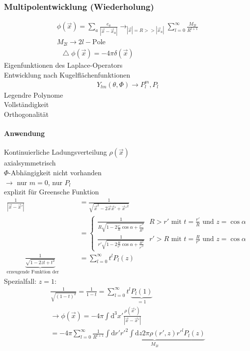 \documentclass[a4paper]{article}
\newcommand*\laplace{\mathop{}\!\mathbin\bigtriangleup}
\begin{document}
\subsubsection{Multipolentwicklung (Wiederholung)}
\begin{align}
\phi(\vec{x})=\sum_a\frac{e_a}{|\vec{x}-\vec{x}_a|}
\rightarrow_{|\vec{x}|=R>>|\vec{x}_a|} \sum^\infty_{l=0}\frac{M_{2l}}{R^{l+1}}\\
M_{2l}\rightarrow2l-\text{Pole}\\
\laplace\phi(\vec{x})=-4\pi\delta(\vec{x})
\end{align}
Eigenfunktionen des Laplace-Operators\\
Entwicklung nach Kugelflächenfunktionen
\begin{align}
Y_{lm}(\theta,\Phi)\rightarrow P_l^m,P_l
\end{align}
Legendre Polynome\\
Vollständigkeit\\
Orthogonalität\\
\paragraph{Anwendung}
Kontinuierliche Ladungsverteilung $\rho(\vec{x})$\\
axialsymmetrisch\\
$\Phi$-Abhängigkeit nicht vorhanden\\
$\rightarrow$ nur $m=0$, nur $P_l$\\
explizit für Greensche Funktion
\begin{align}
\frac{1}{|\vec{x}-\vec{x}'|}&=\frac{1}{\sqrt{\vec{x}^2-2\vec{x}\vec{x}'+\vec{x}'^2}}\\
&=\begin{cases}\frac{1}{R\sqrt{1-2\frac{r'}{R}\cos\alpha+\frac{r'^2}{R^2}}}
\text{  } R>r' \text{ mit } t=\frac{r'}{R} \text { und }z=\cos\alpha\\
\frac{1}{r'\sqrt{1-2\frac{R}{r'}\cos\alpha+\frac{R^2}{r'^2}}} \text{  } r'>R
\text{ mit } t=\frac{R}{r'} \text { und }z=\cos\alpha\end{cases}\\
\underbrace{\frac{1}{\sqrt{1-2zt+t^2}}}_{\text{erzeugende
Funktion der Legende Polynome}}&=\sum^\infty_{l=0}t^l P_l(z)
\end{align}
Spezialfall: $z=1$:
\begin{align}
\frac{1}{\sqrt{(1-t)^2}}=\frac{1}{1-t}=\sum^\infty_{l=0}t^l
\underbrace{P_l(1)}_{=1}\\
\rightarrow
\phi(\vec{x})=-4\pi\int \mathrm{d}^3x'\frac{\rho(\vec{x}')}{|\vec{x}-\vec{x}'|}\\
=-4\pi\sum^\infty_{l=0}\frac{1}{R^{l+1}}\underbrace{\int \mathrm{d}r' r'^2\int \mathrm{d}z 2\pi
\rho(r',z)r'^l P_l(z)}_{M_{2l}}
\end{align}
\end{document}
